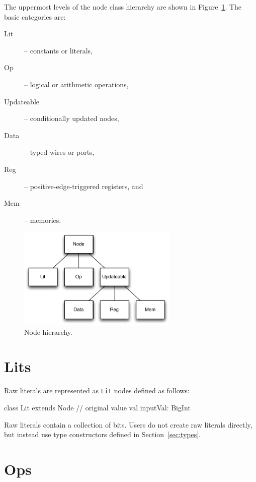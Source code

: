 \documentclass[10pt,twocolumn]{article}
\def\code#1{{\small\tt #1}}
\begin{document}
The uppermost levels of the node class hierarchy are shown in
Figure~\ref{fig:node-hierarchy}.  The basic categories are:

\begin{description}
\item[Lit] -- constants or literals,
\item[Op] -- logical or arithmetic operations,
\item[Updateable] -- conditionally updated nodes,
\item[Data] -- typed wires or ports,
\item[Reg] -- positive-edge-triggered registers, and
\item[Mem] -- memories.
\end{description}

\begin{figure}[h]
\centering
\includegraphics[width=3in]{figs/node-hierarchy.pdf}
\caption{Node hierarchy.}
\label{fig:node-hierarchy}
\end{figure}

\section{Lits}

Raw literals are represented as \code{Lit} nodes defined as follows:

\begin{scala}
class Lit extends Node {
  // original value
  val inputVal: BigInt
}
\end{scala}

\noindent
Raw literals contain a collection of bits.  
Users do not create raw literals directly, but instead use type
constructors defined in Section~\ref{sec:types}.



\section{Ops}
\end{document}
